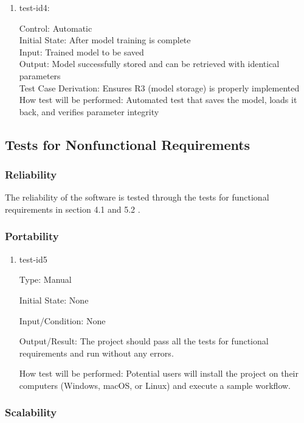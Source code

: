 \documentclass[12pt, titlepage]{article}
\begin{document}
\begin{enumerate}
  \item{test-id4:\\}
  
  Control: Automatic\\
  Initial State: After model training is complete\\
  Input: Trained model to be saved\\
  Output: Model successfully stored and can be retrieved with identical parameters\\
Test Case Derivation: Ensures R3 (model storage) is properly implemented
How test will be performed: Automated test that saves the model, loads it back, and verifies parameter integrity
\end{enumerate}


\subsection{Tests for Nonfunctional Requirements}

\subsubsection{Reliability}

The reliability of the software is tested through the tests for
functional requirements in section 4.1 and 5.2 .

\subsubsection{Portability}

\begin{enumerate}

\item{test-id5\\}

Type: Manual
					
Initial State: None
					
Input/Condition: None
					
Output/Result: The project should pass all the tests for functional requirements and run without any errors.

How test will be performed: Potential users will install the project on their computers (Windows, macOS, or Linux) and execute a sample workflow. 
\end{enumerate}


\subsubsection{Scalability}
\end{document}
